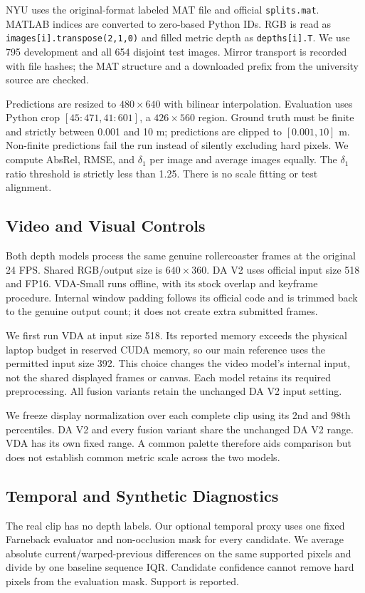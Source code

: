 \documentclass[10pt,twocolumn,letterpaper]{article}
\begin{document}
NYU uses the original-format labeled MAT file and official \texttt{splits.mat}. MATLAB indices are converted to zero-based Python IDs. RGB is read as \texttt{images[i].transpose(2,1,0)} and filled metric depth as \texttt{depths[i].T}. We use 795 development and all 654 disjoint test images. Mirror transport is recorded with file hashes; the MAT structure and a downloaded prefix from the university source are checked.

Predictions are resized to $480\times640$ with bilinear interpolation. Evaluation uses Python crop $[45:471,41:601]$, a $426\times560$ region. Ground truth must be finite and strictly between 0.001 and 10 m; predictions are clipped to $[0.001,10]$ m. Non-finite predictions fail the run instead of silently excluding hard pixels. We compute AbsRel, RMSE, and $\delta_1$ per image and average images equally. The $\delta_1$ ratio threshold is strictly less than 1.25. There is no scale fitting or test alignment.

\subsection{Video and Visual Controls}
Both depth models process the same genuine rollercoaster frames at the original 24 FPS. Shared RGB/output size is $640\times360$. DA V2 uses official input size 518 and FP16. VDA-Small runs offline, with its stock overlap and keyframe procedure. Internal window padding follows its official code and is trimmed back to the genuine output count; it does not create extra submitted frames.

We first run VDA at input size 518. Its reported memory exceeds the physical laptop budget in reserved CUDA memory, so our main reference uses the permitted input size 392. This choice changes the video model's internal input, not the shared displayed frames or canvas. Each model retains its required preprocessing. All fusion variants retain the unchanged DA V2 input setting.

We freeze display normalization over each complete clip using its 2nd and 98th percentiles. DA V2 and every fusion variant share the unchanged DA V2 range. VDA has its own fixed range. A common palette therefore aids comparison but does not establish common metric scale across the two models.

\subsection{Temporal and Synthetic Diagnostics}
The real clip has no depth labels. Our optional temporal proxy uses one fixed Farneback evaluator and non-occlusion mask for every candidate. We average absolute current/warped-previous differences on the same supported pixels and divide by one baseline sequence IQR. Candidate confidence cannot remove hard pixels from the evaluation mask. Support is reported.
\end{document}
